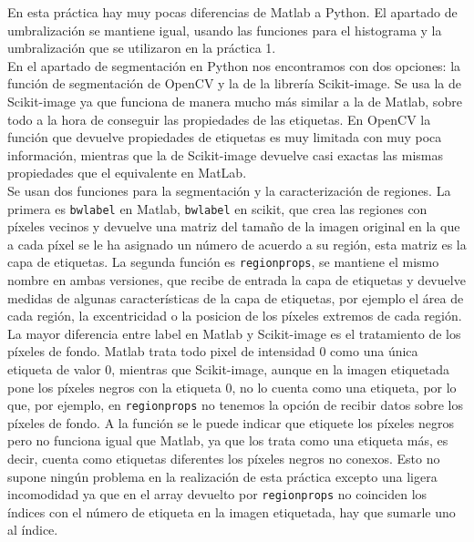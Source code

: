 En esta práctica hay muy pocas diferencias de Matlab a Python. El apartado de umbralización se mantiene igual, usando las funciones para el histograma y la umbralización que se utilizaron en la práctica 1.\\

En el apartado de segmentación en Python nos encontramos con dos opciones: la función de segmentación de OpenCV y la de la librería Scikit-image. Se usa la de Scikit-image ya que funciona de manera mucho más similar a la de Matlab, sobre todo a la hora de conseguir las propiedades de las etiquetas. En OpenCV la función que devuelve propiedades de etiquetas es muy limitada con muy poca información, mientras que la de Scikit-image devuelve casi exactas las mismas propiedades que el equivalente en MatLab.\\


 Se usan dos funciones para la segmentación y la caracterización de regiones. La primera es \texttt{bwlabel} en Matlab, \texttt{bwlabel} en scikit,  que crea las regiones con píxeles vecinos y devuelve una matriz del tamaño de la imagen original en la que a cada píxel se le ha asignado un número de acuerdo a su región, esta matriz es la capa de etiquetas. La segunda función es \texttt{regionprops}, se mantiene el mismo nombre en ambas versiones, que recibe de entrada la capa de etiquetas y devuelve medidas de algunas características de la capa de etiquetas, por ejemplo el área de cada región, la excentricidad o la posicion de los píxeles extremos de cada región.\\

La mayor diferencia entre label en Matlab y Scikit-image es el tratamiento de los píxeles de fondo. Matlab trata todo pixel de intensidad 0 como una única etiqueta de valor 0, mientras que Scikit-image, aunque en la imagen etiquetada pone los píxeles negros con la etiqueta 0, no lo cuenta como una etiqueta, por lo que, por ejemplo, en \texttt{regionprops} no tenemos la opción de recibir datos sobre los píxeles de fondo. A la función se le puede indicar que etiquete los píxeles negros pero no funciona igual que Matlab, ya que los trata como una etiqueta más, es decir, cuenta como etiquetas diferentes los píxeles negros no conexos. Esto no supone ningún problema en la realización de esta práctica excepto una ligera incomodidad ya que en el array devuelto por \texttt{regionprops} no coinciden los índices con el número de etiqueta en la imagen etiquetada, hay que sumarle uno al índice.\\

